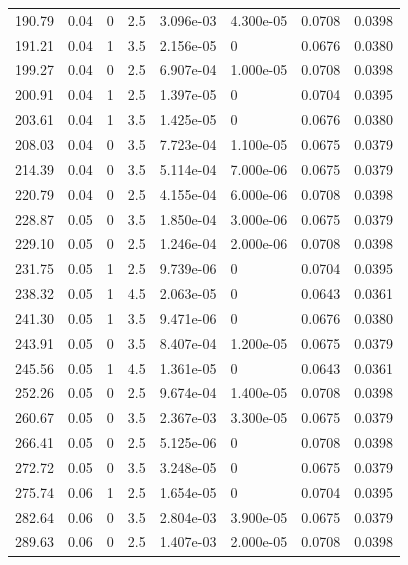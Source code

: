 \documentclass[preview]{standalone}
\begin{document}
{{{\begin{tabular}{L{1.2cm}C{1.2cm} C{0.3cm}C{0.5cm} C{1.4cm}C{1.4cm} C{1.4cm}C{1.4cm}}
  190.79  &  0.04  & 0     & 2.5 &  3.096e-03  & 4.300e-05  & 0.0708 &  0.0398   \\ 
  191.21  &  0.04  & 1     & 3.5 &  2.156e-05  & 0  & 0.0676 &  0.0380   \\ 
  199.27  &  0.04  & 0     & 2.5 &  6.907e-04  & 1.000e-05  & 0.0708 &  0.0398   \\ 
  200.91  &  0.04  & 1     & 2.5 &  1.397e-05  & 0  & 0.0704 &  0.0395   \\ 
  203.61  &  0.04  & 1     & 3.5 &  1.425e-05  & 0  & 0.0676 &  0.0380   \\ 
  208.03  &  0.04  & 0     & 3.5 &  7.723e-04  & 1.100e-05  & 0.0675 &  0.0379   \\ 
  214.39  &  0.04  & 0     & 3.5 &  5.114e-04  & 7.000e-06  & 0.0675 &  0.0379   \\ 
  220.79  &  0.04  & 0     & 2.5 &  4.155e-04  & 6.000e-06  & 0.0708 &  0.0398   \\ 
  228.87  &  0.05  & 0     & 3.5 &  1.850e-04  & 3.000e-06  & 0.0675 &  0.0379   \\ 
  229.10  &  0.05  & 0     & 2.5 &  1.246e-04  & 2.000e-06  & 0.0708 &  0.0398   \\ 
  231.75  &  0.05  & 1     & 2.5 &  9.739e-06  & 0  & 0.0704 &  0.0395   \\ 
  238.32  &  0.05  & 1     & 4.5 &  2.063e-05  & 0  & 0.0643 &  0.0361   \\ 
  241.30  &  0.05  & 1     & 3.5 &  9.471e-06  & 0  & 0.0676 &  0.0380   \\ 
  243.91  &  0.05  & 0     & 3.5 &  8.407e-04  & 1.200e-05  & 0.0675 &  0.0379   \\ 
  245.56  &  0.05  & 1     & 4.5 &  1.361e-05  & 0  & 0.0643 &  0.0361   \\ 
  252.26  &  0.05  & 0     & 2.5 &  9.674e-04  & 1.400e-05  & 0.0708 &  0.0398   \\ 
  260.67  &  0.05  & 0     & 3.5 &  2.367e-03  & 3.300e-05  & 0.0675 &  0.0379   \\ 
  266.41  &  0.05  & 0     & 2.5 &  5.125e-06  & 0  & 0.0708 &  0.0398   \\ 
  272.72  &  0.05  & 0     & 3.5 &  3.248e-05  & 0  & 0.0675 &  0.0379   \\ 
  275.74  &  0.06  & 1     & 2.5 &  1.654e-05  & 0  & 0.0704 &  0.0395   \\ 
  282.64  &  0.06  & 0     & 3.5 &  2.804e-03  & 3.900e-05  & 0.0675 &  0.0379   \\ 
  289.63  &  0.06  & 0     & 2.5 &  1.407e-03  & 2.000e-05  & 0.0708 &  0.0398   \\ 

\end{tabular}}}}
\end{document}
